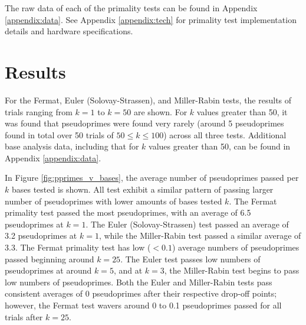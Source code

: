 \documentclass{article}
\begin{document}
The raw data of each of the primality tests can be found in Appendix \ref{appendix:data}.
See Appendix \ref{appendix:tech} for primality test implementation details and hardware specifications.

\section{Results}
For the Fermat, Euler (Solovay-Strassen), and Miller-Rabin tests, the results of trials ranging from $k = 1$ to $k = 50$ are shown. For $k$ values greater than 50, it was found that pseudoprimes were found very rarely (around 5 pseudoprimes found in total over 50 trials of $50 \leq k \leq 100$) across all three tests. Additional base analysis data, including that for $k$ values greater than 50, can be found in Appendix \ref{appendix:data}. 

In Figure \ref{fig:pprimes_v_bases}, the average number of pseudoprimes passed per $k$ bases tested is shown. All test exhibit a similar pattern of passing larger number of pseudoprimes with lower amounts of bases tested $k$. The Fermat primality test passed the most pseudoprimes, with an average of 6.5 pseudoprimes at $k = 1$. The Euler (Solovay-Strassen) test passed an average of 3.2 pseudoprimes at $k = 1$, while the Miller-Rabin test passed a similar average of 3.3. The Fermat primality test has low ($<0.1$) average numbers of pseudoprimes passed beginning around $k = 25$. The Euler test passes low numbers of pseudoprimes at around $k = 5$, and at $k = 3$, the Miller-Rabin test begins to pass low numbers of pseudoprimes. Both the Euler and Miller-Rabin tests pass consistent averages of 0 pseudoprimes after their respective drop-off points; however, the Fermat test wavers around 0 to 0.1 pseudoprimes passed for all trials after $k = 25$.
\end{document}
